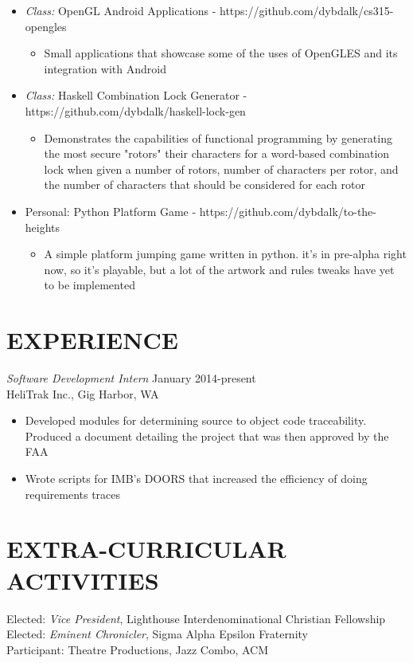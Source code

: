\documentclass[margin]{res}
\begin{document}
\begin{resume}
\begin{itemize}
\begin{itemize}
	\end{itemize}
	\item {\sl Class:} OpenGL Android Applications - https://github.com/dybdalk/cs315-opengles
	\begin{itemize}
	\item Small applications that showcase some of the uses of OpenGLES and its integration with Android
	\end{itemize}
	\item {\sl Class:} Haskell Combination Lock Generator - https://github.com/dybdalk/haskell-lock-gen
	\begin{itemize}
	\item Demonstrates the capabilities of functional programming by generating the most secure "rotors" their characters for a word-based combination lock when given a number of rotors, number of characters per rotor, and the number of characters that should be considered for each rotor
	\end{itemize}
	\item {Personal:} Python Platform Game - https://github.com/dybdalk/to-the-heights
	\begin{itemize}
	\item A simple platform jumping game written in python. it's in pre-alpha right now, so it's playable, but a lot of the artwork and rules tweaks have yet to be implemented
	\end{itemize}
	
\end{itemize}						
 
\section{EXPERIENCE} {\sl Software Development Intern} \hfill January 2014-present \\ 
                HeliTrak Inc., Gig Harbor, WA 
                 \begin{itemize}  \itemsep -2pt %
                 \item   Developed modules for determining source to object code traceability. Produced a document detailing the project that was then approved by the FAA
                \item   Wrote scripts for IMB's DOORS that increased the efficiency of doing requirements traces
                \end{itemize}

\section{EXTRA-CURRICULAR \\ ACTIVITIES}             
            Elected: {\it Vice President}, Lighthouse Interdenominational Christian Fellowship \\
            Elected: {\it Eminent Chronicler}, Sigma Alpha Epsilon Fraternity \\
           	Participant: Theatre Productions, Jazz Combo, ACM
 

\end{resume}
\end{document}
